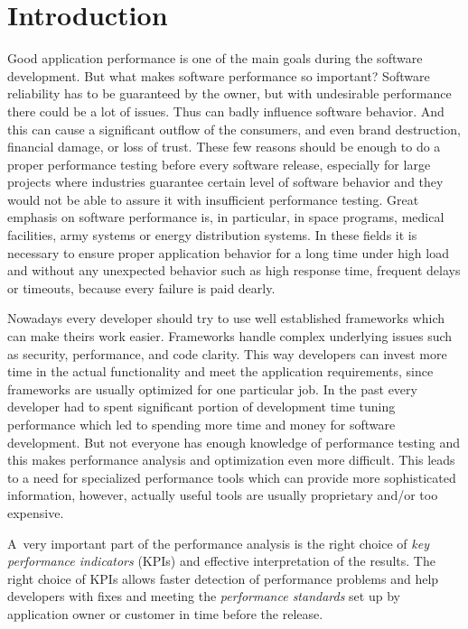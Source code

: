 \chapter{Introduction}
\label{Introduction}
Good application performance is one of the main goals during the software development. But what makes software performance so important? Software reliability has to be guaranteed by the owner, but with undesirable performance there could be a lot of issues. Thus can badly influence software behavior. And this can cause a significant outflow of the consumers, and even brand destruction, financial damage, or loss of trust. These few reasons should be enough to do a proper performance testing before every software release, especially for large projects where industries guarantee certain level of software behavior and they would not be able to assure it with insufficient performance testing. Great emphasis on software performance is, in particular, in space programs, medical facilities, army systems or energy distribution systems. In these fields it is necessary to ensure proper application behavior for a long time under high load and without any unexpected behavior such as high response time, frequent delays or timeouts, because every failure is paid dearly. 

Nowadays every developer should try to use well established frameworks which can make theirs work easier. Frameworks handle complex underlying issues such as security, performance, and code clarity. This way developers can invest more time in the actual functionality and meet the application requirements, since frameworks are usually optimized for one particular job. In the past every developer had to spent significant portion of development time tuning performance which led to spending more time and money for software development. But not everyone has enough knowledge of performance testing and this makes performance analysis and optimization even more difficult. This leads to a need for specialized performance tools which can provide more sophisticated information, however, actually useful tools are usually proprietary and/or too expensive.

A~very important part of the performance analysis is the right choice of \emph{key performance indicators} (KPIs) \cite{Molyneaux:TAoAPT} and effective interpretation of the results. The right choice of KPIs allows faster detection of performance problems and help developers with fixes and meeting the \emph{performance standards} \cite{Molyneaux:TAoAPT} set up by application owner or customer in time before the release. 

